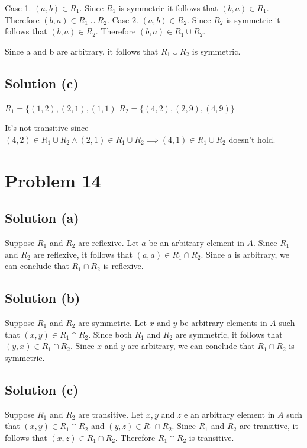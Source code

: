 \documentclass{article}
\begin{document}
Case 1. $(a,b) \in R_1$. Since $R_1$ is symmetric it follows that
$(b,a) \in R_1$. Therefore $(b,a) \in R_1 \cup R_2$. 
Case 2. $(a,b) \in R_2$. Since $R_2$ is symmetric it follows that
$(b,a) \in R_2$. Therefore $(b,a) \in R_1 \cup R_2$.

Since a and b are arbitrary, it follows that $R_1 \cup R_2$ is symmetric.

\subsection{Solution (c)}

$R_1 = \{(1,2), (2,1), (1,1)$
$R_2 = \{(4,2), (2,9), (4,9)\}$

It's not transitive since $(4,2) \in R_1 \cup R_2 \land (2,1) \in R_1
\cup R_2 \implies (4,1) \in R_1 \cup R_2$ doesn't hold.

\section{Problem 14}

\subsection{Solution (a)}

Suppose $R_1$ and $R_2$ are reflexive. Let $a$ be an arbitrary element
in $A$. Since $R_1$ and $R_2$ are reflexive, it follows that $(a,a)
\in R_1 \cap R_2$. Since $a$ is arbitrary, we can conclude that $R_1
\cap R_2$ is reflexive.

\subsection{Solution (b)}

Suppose $R_1$ and $R_2$ are symmetric. Let $x$ and $y$ be arbitrary
elements in $A$ such that $(x,y) \in R_1 \cap R_2$. Since both $R_1$
and $R_2$ are symmetric, it follows that $(y,x) \in R_1 \cap R_2$.
Since $x$ and $y$ are arbitrary, we can conclude that $R_1 \cap R_2$
is symmetric.

\subsection{Solution (c)}

Suppose $R_1$ and $R_2$ are transitive. Let $x, y$ and $z$ e an
arbitrary element in $A$ such that $(x,y) \in R_1 \cap R_2$ and $(y,z)
\in R_1 \cap R_2$. Since $R_1$ and $R_2$ are transitive, it follows
that $(x,z) \in R_1 \cap R_2$. Therefore $R_1 \cap R_2$ is transitive.
\end{document}

